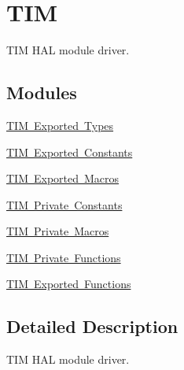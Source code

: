 \hypertarget{group___t_i_m}{}\section{T\+IM}
\label{group___t_i_m}


T\+IM H\+AL module driver.  


\subsection*{Modules}
\begin{DoxyCompactItemize}
\item 
\mbox{\hyperlink{group___t_i_m___exported___types}{T\+I\+M Exported Types}}
\item 
\mbox{\hyperlink{group___t_i_m___exported___constants}{T\+I\+M Exported Constants}}
\item 
\mbox{\hyperlink{group___t_i_m___exported___macros}{T\+I\+M Exported Macros}}
\item 
\mbox{\hyperlink{group___t_i_m___private___constants}{T\+I\+M Private Constants}}
\item 
\mbox{\hyperlink{group___t_i_m___private___macros}{T\+I\+M Private Macros}}
\item 
\mbox{\hyperlink{group___t_i_m___private___functions}{T\+I\+M Private Functions}}
\item 
\mbox{\hyperlink{group___t_i_m___exported___functions}{T\+I\+M Exported Functions}}
\end{DoxyCompactItemize}


\subsection{Detailed Description}
T\+IM H\+AL module driver. 

